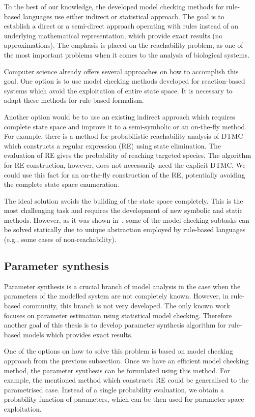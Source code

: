 \documentclass[11pt,a4paper]{report}
\begin{document}
To the best of our knowledge, the developed model checking methods for rule-based languages use either indirect or statistical approach. The goal is to establish a direct or a semi-direct approach operating with rules instead of an underlying mathematical representation, which provide exact results (no approximations). The emphasis is placed on the reachability problem, as one of the most important problems when it comes to the analysis of biological systems.

Computer science already offers several approaches on how to accomplish this goal. One option is to use model checking methods developed for reaction-based systems which avoid the exploitation of entire state space. It is necessary to adapt these methods for rule-based formalism.

Another option would be to use an existing indirect approach which requires complete state space and improve it to a semi-symbolic or an on-the-fly method. For example, there is a method for probabilistic reachability analysis of DTMC which constructs a regular expression (RE) using state elimination. The evaluation of RE gives the probability of reaching targeted species. The algorithm for RE construction, however, does not necessarily need the explicit DTMC. We could use this fact for an on-the-fly construction of the RE, potentially avoiding the complete state space enumeration.

The ideal solution avoids the building of the state space completely. This is the most challenging task and requires the development of new symbolic and static methods. However, as it was shown in~\cite{trojak2018sasb}, some of the model checking subtasks can be solved statically due to unique abstraction employed by rule-based languages (e.g., some cases of non-reachability).

\subsection{Parameter synthesis}

Parameter synthesis is a crucial branch of model analysis in the case when the parameters of the modelled system are not completely known. However, in rule-based community, this branch is not very developed. The only known work focuses on parameter estimation using statistical model checking. Therefore another goal of this thesis is to develop parameter synthesis algorithm for rule-based models which provides exact results.

One of the options on how to solve this problem is based on model checking approach from the previous subsection. Once we have an efficient model checking method, the parameter synthesis can be formulated using this method. For example, the mentioned method which constructs RE could be generalised to the parametrised case. Instead of a single probability evaluation, we obtain a probability function of parameters, which can be then used for parameter space exploitation.
\end{document}
